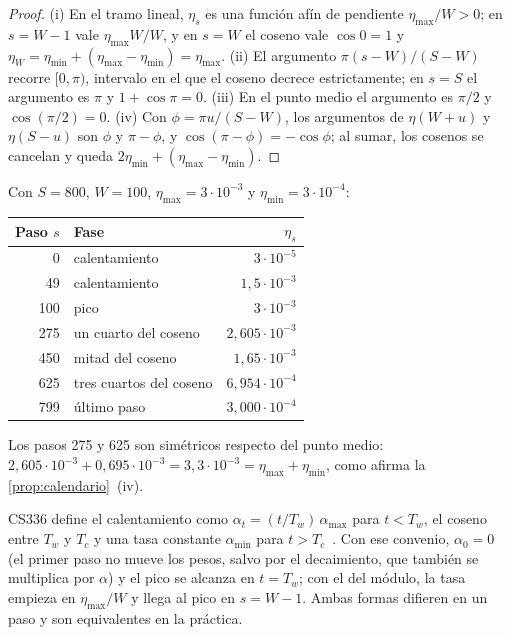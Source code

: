 \begin{proof}
(i) En el tramo lineal, $\eta_s$ es una función afín de pendiente $\eta_{\max}/W>0$; en $s=W-1$ vale $\eta_{\max}W/W$, y en $s=W$ el coseno vale $\cos 0=1$ y $\eta_W=\eta_{\min}+(\eta_{\max}-\eta_{\min})=\eta_{\max}$. (ii) El argumento $\pi(s-W)/(S-W)$ recorre $[0,\pi)$, intervalo en el que el coseno decrece estrictamente; en $s=S$ el argumento es $\pi$ y $1+\cos\pi=0$. (iii) En el punto medio el argumento es $\pi/2$ y $\cos(\pi/2)=0$. (iv) Con $\phi=\pi u/(S-W)$, los argumentos de $\eta(W+u)$ y $\eta(S-u)$ son $\phi$ y $\pi-\phi$, y $\cos(\pi-\phi)=-\cos\phi$; al sumar, los cosenos se cancelan y queda $2\eta_{\min}+(\eta_{\max}-\eta_{\min})$.
\end{proof}

\begin{ejemplo}\label{ej:calendario}
Con $S=800$, $W=100$, $\eta_{\max}=3\cdot 10^{-3}$ y $\eta_{\min}=3\cdot 10^{-4}$:
\begin{center}\small
\begin{tabular}{@{}rlr@{}}
\toprule
Paso $s$ & Fase & $\eta_s$ \\
\midrule
0 & calentamiento & $3\cdot 10^{-5}$ \\
49 & calentamiento & $1{,}5\cdot 10^{-3}$ \\
100 & pico & $3\cdot 10^{-3}$ \\
275 & un cuarto del coseno & $2{,}605\cdot 10^{-3}$ \\
450 & mitad del coseno & $1{,}65\cdot 10^{-3}$ \\
625 & tres cuartos del coseno & $6{,}954\cdot 10^{-4}$ \\
799 & último paso & $3{,}000\cdot 10^{-4}$ \\
\bottomrule
\end{tabular}
\end{center}
Los pasos 275 y 625 son simétricos respecto del punto medio: $2{,}605\cdot 10^{-3}+0{,}695\cdot 10^{-3}=3{,}3\cdot 10^{-3}=\eta_{\max}+\eta_{\min}$, como afirma la \cref{prop:calendario}~(iv).
\end{ejemplo}

\begin{observacion}[El convenio de CS336]\label{obs:cs336-cal}
CS336 define el calentamiento como $\alpha_t=(t/T_w)\,\alpha_{\max}$ para $t<T_w$, el coseno entre $T_w$ y $T_c$ y una tasa constante $\alpha_{\min}$ para $t>T_c$~\cite[§4.4]{cs336}. Con ese convenio, $\alpha_0=0$ (el primer paso no mueve los pesos, salvo por el decaimiento, que también se multiplica por $\alpha$) y el pico se alcanza en $t=T_w$; con el del módulo, la tasa empieza en $\eta_{\max}/W$ y llega al pico en $s=W-1$. Ambas formas difieren en un paso y son equivalentes en la práctica.
\end{observacion}

